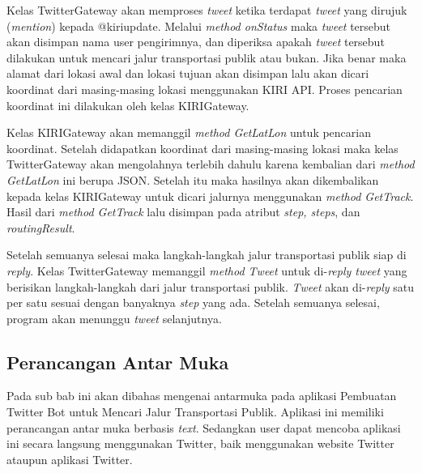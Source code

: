 Kelas TwitterGateway akan memproses \textit{tweet} ketika terdapat \textit{tweet} yang dirujuk (\textit{mention}) kepada @kiriupdate. Melalui \textit{method onStatus} maka \textit{tweet} tersebut akan disimpan nama user pengirimnya, dan diperiksa apakah \textit{tweet} tersebut dilakukan untuk mencari jalur transportasi publik atau bukan. Jika benar maka alamat dari lokasi awal dan lokasi tujuan akan disimpan lalu akan dicari koordinat dari masing-masing lokasi menggunakan KIRI API. Proses pencarian koordinat ini dilakukan oleh kelas KIRIGateway.

Kelas KIRIGateway akan memanggil \textit{method GetLatLon} untuk pencarian koordinat. Setelah didapatkan koordinat dari masing-masing lokasi maka kelas TwitterGateway akan mengolahnya terlebih dahulu karena kembalian dari \textit{method GetLatLon} ini berupa JSON. Setelah itu maka hasilnya akan dikembalikan kepada kelas KIRIGateway untuk dicari jalurnya menggunakan \textit{method GetTrack}. Hasil dari \textit{method GetTrack} lalu disimpan pada atribut \textit{step, steps}, dan \textit{routingResult}.

Setelah semuanya selesai maka langkah-langkah jalur transportasi publik siap di \textit{reply}. Kelas TwitterGateway memanggil \textit{method Tweet} untuk di-\textit{reply tweet} yang berisikan langkah-langkah dari jalur transportasi publik. \textit{Tweet} akan di-\textit{reply} satu per satu sesuai dengan banyaknya \textit{step} yang ada. Setelah semuanya selesai, program akan menunggu \textit{tweet} selanjutnya.

\subsection{Perancangan Antar Muka}

Pada sub bab ini akan dibahas mengenai antarmuka pada aplikasi Pembuatan Twitter Bot untuk Mencari Jalur Transportasi Publik. Aplikasi ini memiliki perancangan antar muka berbasis \textit{text}. Sedangkan user dapat mencoba aplikasi ini secara langsung menggunakan Twitter, baik menggunakan website Twitter ataupun aplikasi Twitter.

